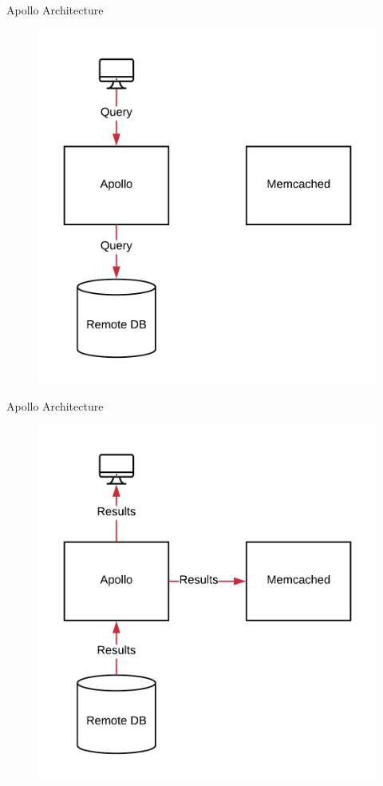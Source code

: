 \documentclass[10pt]{beamer}
\begin{document}
\begin{frame}[fragile]{Apollo Architecture}
    \begin{figure}
        \includegraphics[scale=0.17]{apollo_arch_diagram_5}
    \end{figure}
\end{frame}

\begin{frame}[fragile]{Apollo Architecture}
    \begin{figure}
        \includegraphics[scale=0.17]{apollo_arch_diagram_6}
    \end{figure}
\end{frame}
\end{document}
